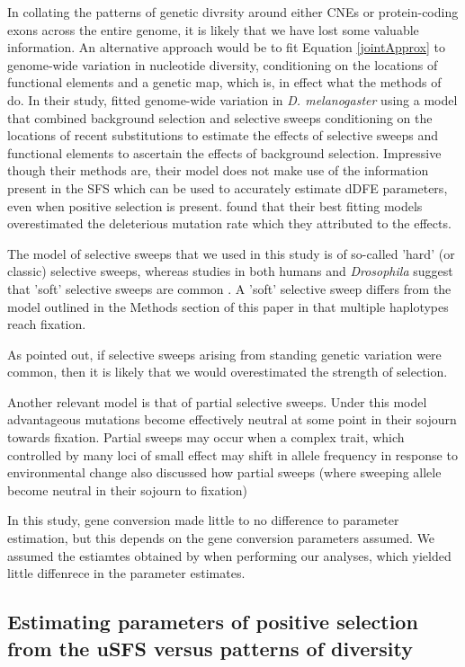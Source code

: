 In collating the patterns of genetic divrsity around either CNEs or protein-coding exons across the entire genome, it is likely that we have lost some valuable information. An alternative approach would be to fit Equation \ref{jointApprox} to genome-wide variation in nucleotide diversity, conditioning on the locations of functional elements and a genetic map, which is, in effect what the methods of \cite{RN274} do. In their study,\cite{RN274} fitted genome-wide variation in \textit{D. melanogaster} using a model that combined background selection and selective sweeps conditioning on the locations of recent substitutions to estimate the effects of selective sweeps and functional elements to ascertain the effects of background selection. Impressive though their methods are, their model does not make use of the information present in the SFS which can be used to accurately estimate dDFE parameters, even when positive selection is present. \cite{RN274} found that their best fitting models overestimated the deleterious mutation rate which they attributed to the effects.

The model of selective sweeps that we used in this study is of so-called 'hard' (or classic) selective sweeps, whereas studies in both humans and \textit{Drosophila} suggest that 'soft' selective sweeps are common \citep{RN303, RN208, RN338}. A 'soft' selective sweep differs from the model outlined in the Methods section of this paper in that multiple haplotypes reach fixation.

As \cite{RN274} pointed out, if selective sweeps arising from standing genetic variation were common, then it is likely that we would overestimated the strength of selection.

Another relevant model is that of partial selective sweeps. Under this model advantageous mutations become effectively neutral at some point in their sojourn towards fixation. 
Partial sweeps may occur when a complex trait, which  controlled by many loci of small effect may shift in allele frequency in response to environmental change 
\cite{RN274} also discussed how partial sweeps (where sweeping allele become neutral in their sojourn to fixation)


In this study, gene conversion made little to no difference to parameter estimation, but this depends on the gene conversion parameters assumed. 
We assumed the estiamtes obtained by \cite{RN263} when performing our analyses, which yielded little diffenrece in the parameter estimates.

\subsection{Estimating parameters of positive selection from the uSFS versus patterns of diversity}

